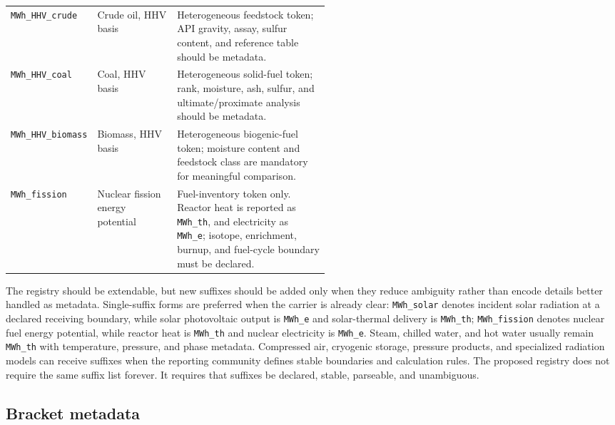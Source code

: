\documentclass[11pt]{article}
\begin{document}
\begin{table}[H]
\begin{tabularx}{\linewidth}{@{}p{0.27\linewidth}p{0.25\linewidth}X@{}}
\texttt{MWh\_HHV\_crude} & Crude oil, HHV basis & Heterogeneous feedstock token; API gravity, assay, sulfur content, and reference table should be metadata. \\
\texttt{MWh\_HHV\_coal} & Coal, HHV basis & Heterogeneous solid-fuel token; rank, moisture, ash, sulfur, and ultimate/proximate analysis should be metadata. \\
\texttt{MWh\_HHV\_biomass} & Biomass, HHV basis & Heterogeneous biogenic-fuel token; moisture content and feedstock class are mandatory for meaningful comparison. \\
\texttt{MWh\_fission} & Nuclear fission energy potential & Fuel-inventory token only. Reactor heat is reported as \texttt{MWh\_th}, and electricity as \texttt{MWh\_e}; isotope, enrichment, burnup, and fuel-cycle boundary must be declared. \\
\bottomrule
\end{tabularx}
\end{table}

The registry should be extendable, but new suffixes should be added only when they reduce ambiguity rather than encode details better handled as metadata. Single-suffix forms are preferred when the carrier is already clear: \texttt{MWh\_solar} denotes incident solar radiation at a declared receiving boundary, while solar photovoltaic output is \texttt{MWh\_e} and solar-thermal delivery is \texttt{MWh\_th}; \texttt{MWh\_fission} denotes nuclear fuel energy potential, while reactor heat is \texttt{MWh\_th} and nuclear electricity is \texttt{MWh\_e}. Steam, chilled water, and hot water usually remain \texttt{MWh\_th} with temperature, pressure, and phase metadata. Compressed air, cryogenic storage, pressure products, and specialized radiation models can receive suffixes when the reporting community defines stable boundaries and calculation rules. The proposed registry does not require the same suffix list forever. It requires that suffixes be declared, stable, parseable, and unambiguous.

\subsection{Bracket metadata}
\end{document}
